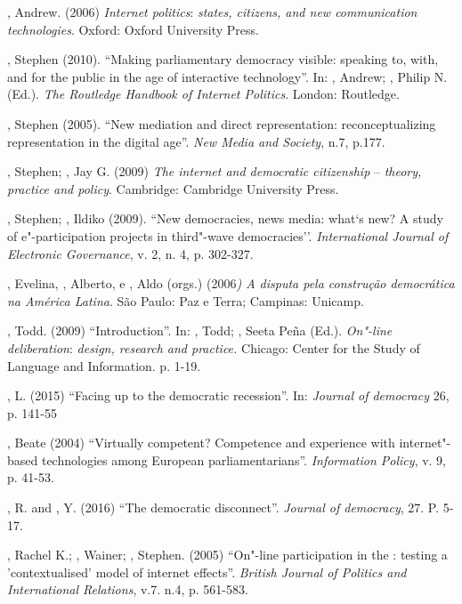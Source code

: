 \begin{Parskip}
, Andrew. (2006) \emph{Internet politics}: \emph{states,
citizens, and new communication technologies}. Oxford: Oxford University
Press.

, Stephen (2010). ``Making parliamentary democracy visible:
speaking to, with, and for the public in the age of interactive
technology''. In: , Andrew; , Philip N. (Ed.). \emph{The
Routledge Handbook of Internet Politics}. London: Routledge.

, Stephen (2005). ``New mediation and direct representation:
reconceptualizing representation in the digital age''. \emph{New Media
and Society}, n.7, p.177.

, Stephen; , Jay G. (2009) \emph{The internet and
democratic citizenship} -- \emph{theory, practice and policy}.
Cambridge: Cambridge University Press.

, Stephen; , Ildiko (2009). ``New democracies, news media:
what`s new? A study of e"-participation projects in third"-wave
democracies''. \emph{International Journal of Electronic Governance}, v.
2, n. 4, p. 302-327.

, Evelina, , Alberto, e , Aldo (orgs.) (2006\emph{)
A disputa pela construção democrática na América Latina}. São Paulo: Paz
e Terra; Campinas: Unicamp.

, Todd. (2009) ``Introduction''. In: , Todd; ,
Seeta Peña (Ed.). \emph{On"-line deliberation}: \emph{design, research
and practice.} Chicago: Center for the Study of Language and
Information. p. 1-19.

, L. (2015) ``Facing up to the democratic recession''. In:
\emph{Journal of democracy} 26, p. 141-55

, Beate (2004) ``Virtually competent? Competence and experience
with internet"-based technologies among European parliamentarians''.
\emph{Information Policy}, v. 9, p. 41-53.

, R. and , Y. (2016) ``The democratic disconnect''.
\emph{Journal of democracy}, 27. P. 5-17.

, Rachel K.; , Wainer; , Stephen. (2005) ``On"-line
participation in the : testing a 'contextualised' model of internet
effects''. \emph{British Journal of Politics and International
Relations}, v.7. n.4, p. 561-583.


\end{Parskip}
